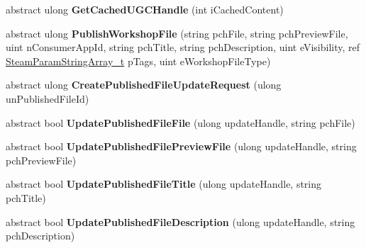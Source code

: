 \begin{DoxyCompactItemize}
abstract ulong {\bfseries Get\+Cached\+U\+G\+C\+Handle} (int i\+Cached\+Content)
\item 
\mbox{\label{class_valve_1_1_steamworks_1_1_i_steam_remote_storage_a76077f1c5b097c9dfd14475104c08a00}} 
abstract ulong {\bfseries Publish\+Workshop\+File} (string pch\+File, string pch\+Preview\+File, uint n\+Consumer\+App\+Id, string pch\+Title, string pch\+Description, uint e\+Visibility, ref \hyperlink{struct_valve_1_1_steamworks_1_1_steam_param_string_array__t}{Steam\+Param\+String\+Array\+\_\+t} p\+Tags, uint e\+Workshop\+File\+Type)
\item 
\mbox{\label{class_valve_1_1_steamworks_1_1_i_steam_remote_storage_a0d4ef9694c7f06c707c2188c9fa60374}} 
abstract ulong {\bfseries Create\+Published\+File\+Update\+Request} (ulong un\+Published\+File\+Id)
\item 
\mbox{\label{class_valve_1_1_steamworks_1_1_i_steam_remote_storage_a244bae1d29d85394ccafbbf8dd737170}} 
abstract bool {\bfseries Update\+Published\+File\+File} (ulong update\+Handle, string pch\+File)
\item 
\mbox{\label{class_valve_1_1_steamworks_1_1_i_steam_remote_storage_a8e6dc07e62fba8000135189c9d96ca95}} 
abstract bool {\bfseries Update\+Published\+File\+Preview\+File} (ulong update\+Handle, string pch\+Preview\+File)
\item 
\mbox{\label{class_valve_1_1_steamworks_1_1_i_steam_remote_storage_a5639093a1284eb20c2ab9b74c34a4fa1}} 
abstract bool {\bfseries Update\+Published\+File\+Title} (ulong update\+Handle, string pch\+Title)
\item 
\mbox{\label{class_valve_1_1_steamworks_1_1_i_steam_remote_storage_a31ba8eba09adc80ca6c89ec34ac285eb}} 
abstract bool {\bfseries Update\+Published\+File\+Description} (ulong update\+Handle, string pch\+Description)
\item 
\mbox{\label{class_valve_1_1_steamworks_1_1_i_steam_remote_storage_a3c21560a3cf8ddd057f5e6d42eef4122}} 

\end{DoxyCompactItemize}
